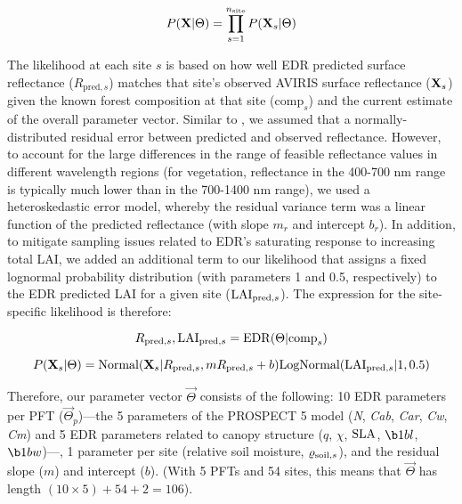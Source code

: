 \begin{equation}
  P(\mathbf{X} | \relax{\Theta}) = \prod_{s=1}^{n_{\mathrm{site}}} P(\mathbf{X}_{s} | \relax{\Theta})
\end{equation}

The likelihood at each site $s$ is based on how well EDR predicted surface reflectance ($R_{\mathrm{pred}, s}$) matches that site's observed AVIRIS surface reflectance ($\mathbf{X}_{s}$)
given the known forest composition at that site ($\mathrm{comp}_{s}$) and the current estimate of the overall parameter vector.
Similar to \citet{shiklomanov2016quantifying}, we assumed that a normally-distributed residual error between predicted and observed reflectance.
However, to account for the large differences in the range of feasible reflectance values in different wavelength regions
(for vegetation, reflectance in the 400-700 \unit{nm} range is typically much lower than in the 700-1400 \unit{nm} range),
we used a heteroskedastic error model, whereby the residual variance term was a linear function of the predicted reflectance (with slope $m_{r}$ and intercept $b_{r}$).
In addition, to mitigate sampling issues related to EDR's saturating response to increasing total LAI, we added an additional term to our likelihood that assigns a fixed lognormal probability distribution (with parameters 1 and 0.5, respectively) to the EDR predicted LAI for a given site ($\mathrm{LAI}_{\mathrm{pred}, s}$).
The expression for the site-specific likelihood is therefore:

\begin{equation}
  R_{\mathrm{pred}, s}, \mathrm{LAI}_{\mathrm{pred}, s} = \mathrm{EDR}(\relax{\Theta} | \mathrm{comp}_{s})
\end{equation}

\begin{equation}
  P(\mathbf{X}_{s} | \relax{\Theta}) =
  \mathrm{Normal}(\mathbf{X}_{s} | R_{\mathrm{pred}, s}, m R_{\mathrm{pred}, s} + b)
  \mathrm{LogNormal}(\mathrm{LAI}_{\mathrm{pred}, s} | 1, 0.5)
\end{equation}

Therefore, our parameter vector $\vec{\Theta}$ consists of the following:
10 EDR parameters per PFT ($\vec{\Theta}_{p}$)---the 5 parameters of the PROSPECT 5 model (\emph{N}, \emph{Cab}, \emph{Car}, \emph{Cw}, \emph{Cm}) and 5 EDR parameters related to canopy structure ($q$, $\chi$, $\mathrm{SLA}$, $\b1bl$, $\b1bw$)---,
1 parameter per site (relative soil moisture, $\varrho_{\mathrm{soil}, s}$),
and the residual slope ($m$) and intercept ($b$).
(With 5 PFTs and 54 sites, this means that $\vec{\Theta}$ has length $(10 \times 5) + 54 + 2 = 106$).

